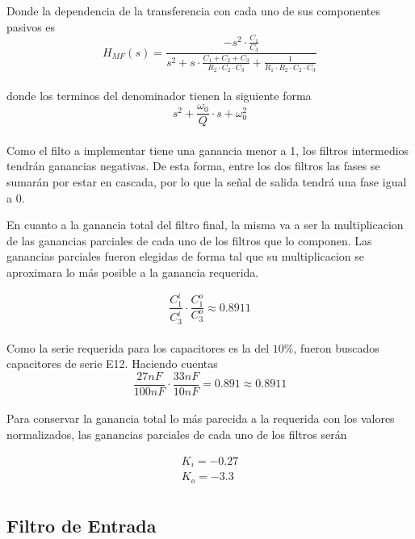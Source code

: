 \documentclass[10pt,a4paper]{article}
\begin{document}

    Donde la dependencia de la transferencia con cada uno de sus componentes pasivos es \\

    \[ H_{MF}(s) = \frac{-s^{2}\cdot \frac{C_{1}}{C_{3}}}{s^{2}+s \cdot \frac{C_{1}+C_{2}+C_{3}}{R_{2}\cdot C_{2} \cdot C_{3}} + \frac{1}{R_{1} \cdot R_{2} \cdot C_{2} \cdot C_{3}}} \] \\

    donde los terminos del denominador tienen la siguiente forma \\

    \[s^{2}+ \frac{\omega_{0}}{Q} \cdot s + \omega_{0}^{2} \] \\

    Como el filto a implementar tiene una ganancia menor a 1, los filtros intermedios tendrán ganancias negativas.
    De esta forma, entre los dos filtros las fases se sumarán por estar en cascada, por lo que la señal de salida tendrá una fase igual a $0$.

    En cuanto a la ganancia total del filtro final, la misma va a ser la multiplicacion de las ganancias parciales de cada uno de los filtros que lo componen.
    Las ganancias parciales fueron elegidas de forma tal que su multiplicacion se aproximara lo más posible a la ganancia requerida.

    \[ \frac{C_{1}^{i}}{C_{3}^{i}} \cdot \frac{C_{1}^{o}}{C_{3}^{o}} \approx  0.8911 \] \\

    Como la serie requerida para los capacitores es la del $10\%$, fueron buscados capacitores de serie E12.
    Haciendo cuentas \\

    \[ \frac{27nF}{100nF} \cdot \frac{33nF}{10nF} = 0.891 \approx  0.8911 \] \\

    Para conservar la ganancia total lo más parecida a la requerida con los valores normalizados, las ganancias parciales de cada uno de los filtros serán

    \begin{gather*}
        K_{i} = -0.27\\
        K_{o} = -3.3\\
    \end{gather*}

    \subsection{Filtro de Entrada}\label{subsec:filtro-de-entrada}
\end{document}
